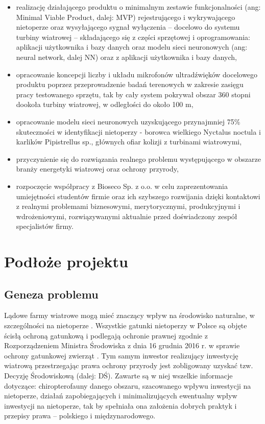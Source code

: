 \documentclass{sprz}
\begin{document}
\begin{itemize}
  \item{realizację działającego produktu o minimalnym zestawie funkcjonalności (ang: Minimal Viable Product, dalej: MVP) rejestrującego i wykrywającego nietoperze oraz wysyłającego sygnał wyłączenia – docelowo do systemu turbiny wiatrowej – składającego się z części sprzętowej i oprogramowania: aplikacji użytkownika i bazy danych oraz modelu sieci neuronowych (ang: neural network, dalej NN) oraz z aplikacji użytkownika i bazy danych,}
  \item{opracowanie koncepcji liczby i układu mikrofonów ultradźwięków docelowego produktu poprzez przeprowadzenie badań terenowych w zakresie zasięgu pracy testowanego sprzętu, tak by cały system pokrywał obszar 360 stopni dookoła turbiny wiatrowej, w odległości do około 100 m,}
  \item{opracowanie modelu sieci neuronowych uzyskującego przynajmniej 75\% skuteczności w identyfikacji nietoperzy - borowca wielkiego Nyctalus noctula i karlików Pipistrellus sp., głównych ofiar kolizji z turbinami wiatrowymi,}
  \item{przyczynienie się do rozwiązania realnego problemu występującego w obszarze branży energetyki wiatrowej oraz ochrony przyrody,}
  \item{rozpoczęcie współpracy z Bioseco Sp. z o.o. w celu zaprezentowania umiejętności studentów firmie oraz ich szybszego rozwijania dzięki kontaktowi z realnymi problemami biznesowymi, merytorycznymi, produkcyjnymi i wdrożeniowymi, rozwiązywanymi aktualnie przed doświadczony zespół specjalistów firmy.}
  \end{itemize}
  

\chapter{Podłoże projektu}

\section{Geneza problemu}

Lądowe farmy wiatrowe mogą mieć znaczący wpływ na środowisko naturalne, w szczególności na nietoperze \cite{Wytyczne}. Wszystkie gatunki nietoperzy w Polsce są objęte ścisłą ochroną gatunkową i podlegają ochronie prawnej zgodnie z Rozporządzeniem Ministra Środowiska z dnia 16 grudnia 2016 r. w sprawie ochrony gatunkowej zwierząt \cite{Rozporządzenie}. Tym samym inwestor realizujący inwestycję wiatrową przestrzegając prawa ochrony przyrody jest zobligowany uzyskać tzw. Decyzję Środowiskową (dalej: DŚ). Zawarte są w niej wszelkie informacje dotyczące: chiropterofauny danego obszaru, szacowanego wpływu inwestycji na nietoperze, działań zapobiegających i minimalizujących ewentualny wpływ inwestycji na nietoperze, tak by spełniała ona założenia dobrych praktyk i przepisy prawa – polskiego i międzynarodowego. 
\end{document}
